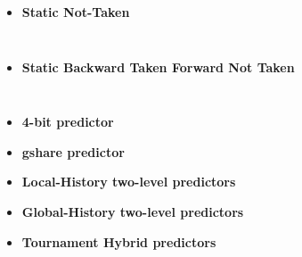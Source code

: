 \documentclass[a4paper,12pt]{article}
\begin{document}
\begin{itemize}
    \item \textbf{Static Not-Taken}
        \inputminted[linenos,fontsize=\footnotesize,frame=leftline]{cpp}{files/src-C1-nt_predictor.h}
        \inputminted[linenos,fontsize=\footnotesize,frame=leftline]{cpp}{files/src-C1-nt_predictor.cpp}
    \item \textbf{Static Backward Taken Forward Not Taken}
        \inputminted[linenos,fontsize=\footnotesize,frame=leftline]{cpp}{files/src-C1-btfnt_predictor.h}
        \inputminted[linenos,fontsize=\footnotesize,frame=leftline]{cpp}{files/src-C1-btfnt_predictor.cpp}
    \item \textbf{4-bit predictor}
    \item \textbf{gshare predictor}
    \item \textbf{Local-History two-level predictors}
    \item \textbf{Global-History two-level predictors}
    \item \textbf{Tournament Hybrid predictors}

\end{itemize}

\end{document}
